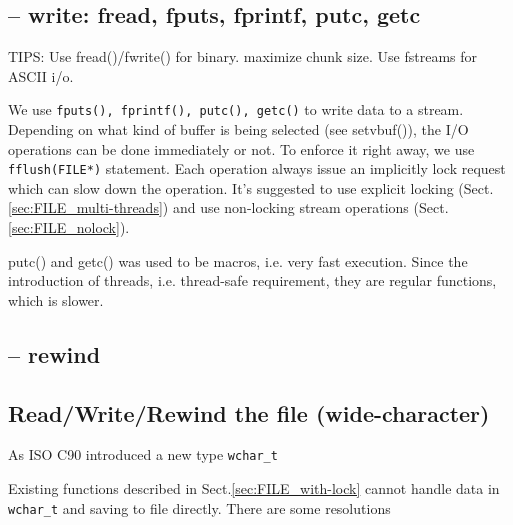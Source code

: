 \subsection{-- write: fread, fputs, fprintf, putc, getc}


TIPS: Use fread()/fwrite() for binary. maximize chunk size. Use fstreams for
ASCII i/o. 

We use \verb!fputs(), fprintf(), putc(), getc()! to write data to a stream.
Depending on what kind of buffer is being selected (see setvbuf()), the I/O
operations can be done immediately or not. To enforce it right away, we use
\verb!fflush(FILE*)! statement. Each operation always issue an implicitly lock
request which can slow down the operation.
It's suggested to use explicit locking (Sect.\ref{sec:FILE_multi-threads}) and
use non-locking stream operations (Sect.\ref{sec:FILE_nolock}).

\begin{mdframed}
putc() and getc() was used to be macros, i.e. very fast execution. Since the
introduction of threads, i.e. thread-safe requirement, they are regular
functions, which is slower.
\end{mdframed}

\subsection{-- rewind}


\subsection{Read/Write/Rewind the file (wide-character)}
\label{sec:FILE_with-lock-wide-character}

As ISO C90 introduced a new type \verb!wchar_t!

Existing functions described in Sect.\ref{sec:FILE_with-lock} cannot handle data
in \verb!wchar_t! and saving to file directly. There are some resolutions

